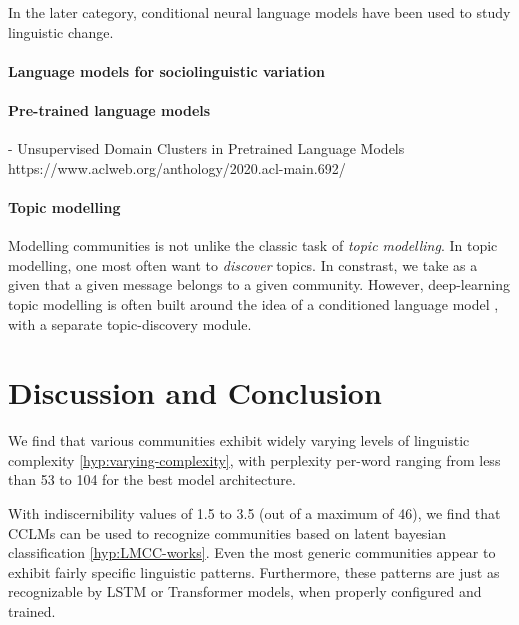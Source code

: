 \documentclass[11pt,a4paper]{article}
\begin{document}
In the later category, conditional neural language models have been
used to study linguistic change.



\paragraph{Language models for sociolinguistic variation}
\cite{DelTredici2017}

\cite{khan2020reddit}


\paragraph{Pre-trained language models}
- Unsupervised Domain Clusters in Pretrained Language Models https://www.aclweb.org/anthology/2020.acl-main.692/ %

\paragraph{Topic modelling}
Modelling communities is not unlike the classic task of \emph{topic
  modelling}. In topic modelling, one most often want to
\emph{discover} topics. In constrast, we take as a given that a given
message belongs to a given community. However, deep-learning topic
modelling is often built around the idea of a conditioned language
model \citep{Lau2017a}, with a separate topic-discovery module.



\section{Discussion and Conclusion}


We find that various communities exhibit widely varying levels of
linguistic complexity \ref{hyp:varying-complexity}, with perplexity
per-word ranging from less than 53 to 104 for the best model
architecture.

With indiscernibility values of 1.5 to 3.5 (out of a maximum of 46),
we find that CCLMs can be used to recognize communities based on
latent bayesian classification \ref{hyp:LMCC-works}. Even the most
generic communities appear to exhibit fairly specific linguistic
patterns. Furthermore, these patterns are just as recognizable by LSTM
or Transformer models, when properly configured and trained.
\end{document}
